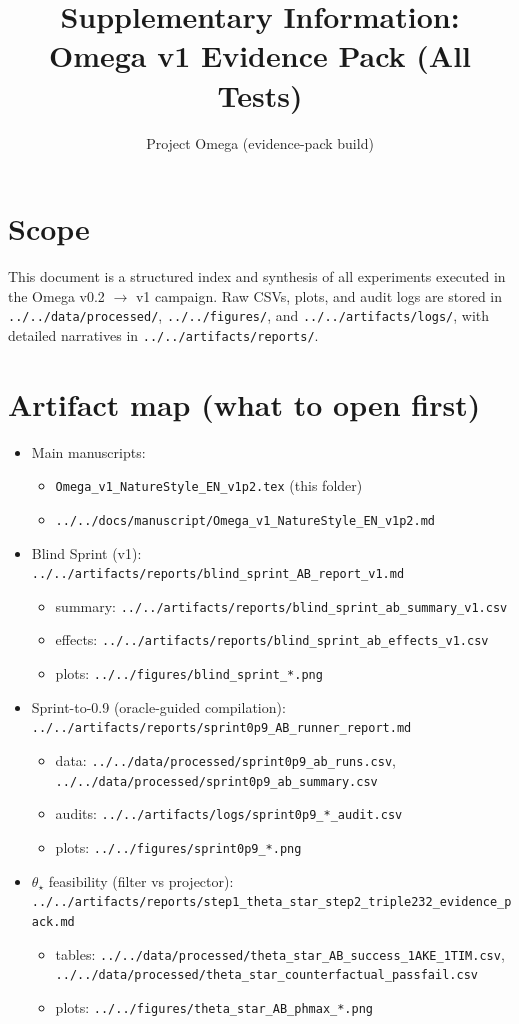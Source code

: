 \documentclass[10pt]{article}
\title{Supplementary Information: Omega v1 Evidence Pack (All Tests)}
\author{Project Omega (evidence-pack build)}
\date{}
\begin{document}
\maketitle

\section*{Scope}
This document is a structured index and synthesis of all experiments executed in the Omega v0.2 \(\rightarrow\) v1 campaign.
Raw CSVs, plots, and audit logs are stored in \texttt{../../data/processed/}, \texttt{../../figures/}, and \texttt{../../artifacts/logs/}, with detailed narratives in \texttt{../../artifacts/reports/}.

\section{Artifact map (what to open first)}
\begin{itemize}[leftmargin=*]
\item Main manuscripts:
  \begin{itemize}
    \item \texttt{Omega\_v1\_NatureStyle\_EN\_v1p2.tex} (this folder)
    \item \texttt{../../docs/manuscript/Omega\_v1\_NatureStyle\_EN\_v1p2.md}
  \end{itemize}
\item Blind Sprint (v1): \texttt{../../artifacts/reports/blind\_sprint\_AB\_report\_v1.md}
  \begin{itemize}
    \item summary: \texttt{../../artifacts/reports/blind\_sprint\_ab\_summary\_v1.csv}
    \item effects: \texttt{../../artifacts/reports/blind\_sprint\_ab\_effects\_v1.csv}
    \item plots: \texttt{../../figures/blind\_sprint\_*.png}
  \end{itemize}
\item Sprint-to-0.9 (oracle-guided compilation): \texttt{../../artifacts/reports/sprint0p9\_AB\_runner\_report.md}
  \begin{itemize}
    \item data: \texttt{../../data/processed/sprint0p9\_ab\_runs.csv}, \texttt{../../data/processed/sprint0p9\_ab\_summary.csv}
    \item audits: \texttt{../../artifacts/logs/sprint0p9\_*\_audit.csv}
    \item plots: \texttt{../../figures/sprint0p9\_*.png}
  \end{itemize}
\item \(\theta_\star\) feasibility (filter vs projector): \texttt{../../artifacts/reports/step1\_theta\_star\_step2\_triple232\_evidence\_pack.md}
  \begin{itemize}
    \item tables: \texttt{../../data/processed/theta\_star\_AB\_success\_1AKE\_1TIM.csv}, \texttt{../../data/processed/theta\_star\_counterfactual\_passfail.csv}
    \item plots: \texttt{../../figures/theta\_star\_AB\_phmax\_*.png}
  \end{itemize}
\end{itemize}
\end{document}
